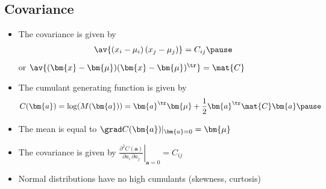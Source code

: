 \begin{slide}
\section[-2]{Covariance}
  
\begin{PauseHighLight}
  \begin{itemize}
  \item The covariance is given by
    \begin{align*}
      \av{(x_i-\mu_i)\,(x_j-\mu_j)} = C_{ij}\pause
    \end{align*}
    or $\av{(\bm{x}-\bm{\mu})(\bm{x}-\bm{\mu})^\tr} = \mat{C}$\pauseb
  \item The cumulant generating function is given by
    \begin{align*}
      C(\bm{a}) = \log(M(\bm{a}))
      = \bm{a}^\tr \bm{\mu} + \frac{1}{2} \bm{a}^\tr \mat{C} \bm{a}\pause
    \end{align*}
  \item The mean is equal to $\grad C(\bm{a}) |_{\bm{a}=0} =
    \bm{\mu}$\pause
  \item The covariance is given by $\left. \frac{\partial^2
        C(\bm{a})}{\partial a_i \,\partial a_j} \right|_{\bm{a}=0} =
    C_{ij}$\pause
  \item Normal distributions have no high cumulants (skewness, curtosis)\pause
  \end{itemize}
\end{PauseHighLight}

\end{slide}



